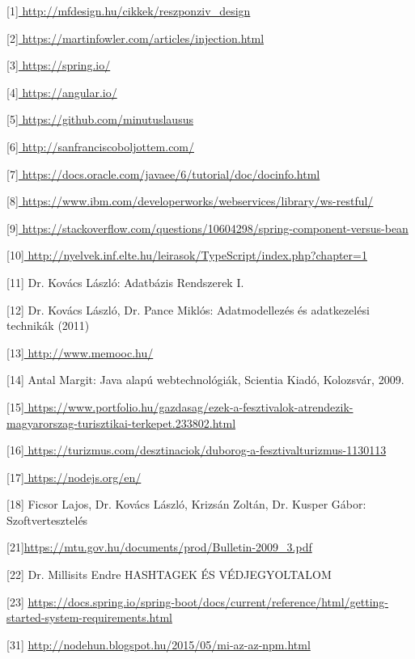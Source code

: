 \begin{thebibliography}{x}




[1]\url{ http://mfdesign.hu/cikkek/reszponziv_design } %

[2]\url{ https://martinfowler.com/articles/injection.html }

[3]\url{ https://spring.io/ }

[4]\url{ https://angular.io/ }

[5]\url{ https://github.com/minutuslausus }

[6]\url{ http://sanfranciscoboljottem.com/ }

[7]\url{ https://docs.oracle.com/javaee/6/tutorial/doc/docinfo.html }

[8]\url{ https://www.ibm.com/developerworks/webservices/library/ws-restful/ }

[9]\url{ https://stackoverflow.com/questions/10604298/spring-component-versus-bean }

[10]\url{ http://nyelvek.inf.elte.hu/leirasok/TypeScript/index.php?chapter=1 }

[11] Dr. Kovács László: Adatbázis Rendszerek I.

[12] Dr. Kovács László, Dr. Pance Miklós: Adatmodellezés és adatkezelési technikák (2011)

[13]\url{ http://www.memooc.hu/ }

[14] Antal Margit: Java alapú webtechnológiák, Scientia Kiadó, Kolozsvár, 2009.

[15]\url{ https://www.portfolio.hu/gazdasag/ezek-a-fesztivalok-atrendezik-magyarorszag-turisztikai-terkepet.233802.html } %

[16]\url{ https://turizmus.com/desztinaciok/duborog-a-fesztivalturizmus-1130113 } %

[17]\url{ https://nodejs.org/en/ }

[18] Ficsor Lajos, Dr. Kovács László, Krizsán Zoltán, Dr. Kusper Gábor: Szoftvertesztelés

[21]\url{https://mtu.gov.hu/documents/prod/Bulletin-2009_3.pdf } %

[22] Dr. Millisits Endre HASHTAGEK ÉS VÉDJEGYOLTALOM

[23] \url{ https://docs.spring.io/spring-boot/docs/current/reference/html/getting-started-system-requirements.html }

[31] \url{ http://nodehun.blogspot.hu/2015/05/mi-az-az-npm.html } %

\end{thebibliography}
